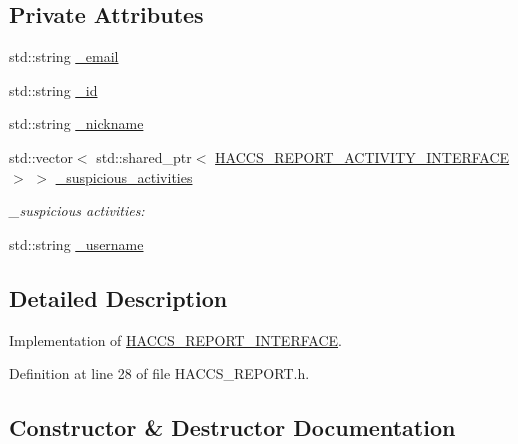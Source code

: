 \subsection*{Private Attributes}
\begin{DoxyCompactItemize}
\item 
std\+::string \hyperlink{classAsteroids_1_1Domain_1_1Server_1_1HACCS__REPORT_a10f6792d50333b7e862b56b3eb63f938}{\+\_\+email}
\item 
std\+::string \hyperlink{classAsteroids_1_1Domain_1_1Server_1_1HACCS__REPORT_a05f61fcaa97035fd5e8fbcf45553f342}{\+\_\+id}
\item 
std\+::string \hyperlink{classAsteroids_1_1Domain_1_1Server_1_1HACCS__REPORT_ae4c9fd63a20205a923169a92c6d7b87d}{\+\_\+nickname}
\item 
std\+::vector$<$ std\+::shared\+\_\+ptr$<$ \hyperlink{classAsteroids_1_1Domain_1_1Server_1_1HACCS__REPORT__ACTIVITY__INTERFACE}{H\+A\+C\+C\+S\+\_\+\+R\+E\+P\+O\+R\+T\+\_\+\+A\+C\+T\+I\+V\+I\+T\+Y\+\_\+\+I\+N\+T\+E\+R\+F\+A\+CE} $>$ $>$ \hyperlink{classAsteroids_1_1Domain_1_1Server_1_1HACCS__REPORT_a33852dfe8d5f96befa05626c374c23d0}{\+\_\+suspicious\+\_\+activities}
\begin{DoxyCompactList}\small\item\em \+\_\+suspicious activities\+: \end{DoxyCompactList}\item 
std\+::string \hyperlink{classAsteroids_1_1Domain_1_1Server_1_1HACCS__REPORT_a9038844567cdd62d4ea9094ba76f21fa}{\+\_\+username}
\end{DoxyCompactItemize}


\subsection{Detailed Description}
Implementation of \hyperlink{classAsteroids_1_1Domain_1_1Server_1_1HACCS__REPORT__INTERFACE}{H\+A\+C\+C\+S\+\_\+\+R\+E\+P\+O\+R\+T\+\_\+\+I\+N\+T\+E\+R\+F\+A\+CE}. 

Definition at line 28 of file H\+A\+C\+C\+S\+\_\+\+R\+E\+P\+O\+R\+T.\+h.



\subsection{Constructor \& Destructor Documentation}
\mbox{\label{classAsteroids_1_1Domain_1_1Server_1_1HACCS__REPORT_a23cfcd0e92df6dd9c5f6b3ddbf3af55f}} 
